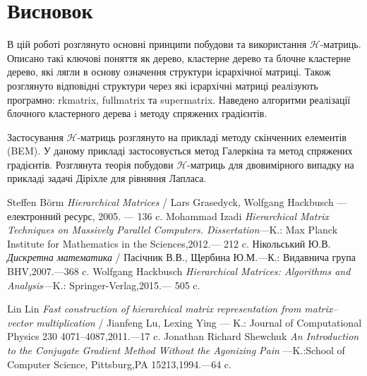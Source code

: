\documentclass[12pt]{report}
\begin{document}
	\chapter{Висновок}
	\hspace{0.8cm} В цій роботі розглянуто основні принципи побудови та використання $\mathcal{H}$-матриць. Описано такі ключові поняття як дерево, кластерне дерево та блочне кластерне дерево, які лягли в основу означення структури ієрархічної матриці. Також розглянуто відповідні структури через які ієрархічні матриці реалізують програмно: rkmatrix, fullmatrix та supermatrix. Наведено алгоритми реалізації блочного кластерного дерева i методу спряжених градієнтів.
	\par Застосування $\mathcal{H}$-матриць розглянуто на прикладі методу скінченних елементів (BEM). У даному прикладі застосовується метод Галеркіна та метод спряжених градієнтів. Розглянута теорія побудови $\mathcal{H}$-матриць для двовимірного випадку на прикладі задачі Діріхле для рівняння Лапласа.
	\newpage
	\begin{thebibliography}{00}
	\normalsize{
	    	Steffen B\"orm {\it Hierarchical Matrices} / Lars Grasedyck, Wolfgang Hackbusch --- електронний ресурс, 2005. --- 136 c.
			Mohammad Izadi {\it Hierarchical Matrix Techniques on Massively Parallel Computers. Dissertation}---K.: Max Planck Institute for Mathematics in the Sciences,2012.--- 212 c.
			Нікольський Ю.В. {\it Дискретна математика} / Пасічник В.В., Щербина Ю.М.---К.: Видавнича група BHV,2007.---368 c.
			 Wolfgang Hackbusch {\it Hierarchical Matrices: Algorithms and Analysis}---K.: Springer-Verlag,2015.--- 505 c.
		
			Lin Lin {\it Fast construction of hierarchical matrix representation from matrix–vector
			multiplication } /  Jianfeng Lu, Lexing Ying --- K.: Journal of Computational Physics 230 4071–4087,2011.---17 c.
			Jonathan Richard Shewchuk {\it An Introduction to the Conjugate Gradient Method Without the Agonizing Pain }---K.:School of Computer Science, Pittsburg,PA 15213,1994.---64 c. 	 
	}
	\end{thebibliography}	
\end{document}
